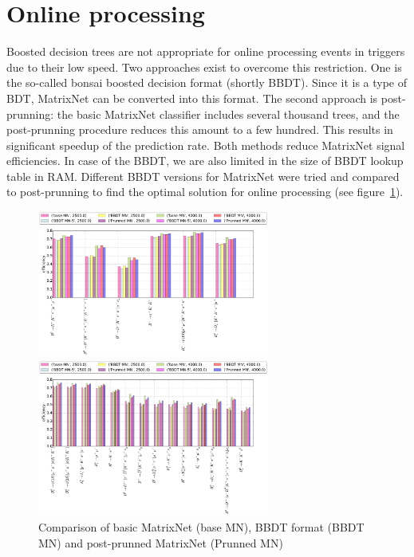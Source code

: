 \documentclass[a4paper]{jpconf}
\begin{document}
\section{Online processing}
Boosted decision trees are not appropriate for online processing events in triggers due to their low speed. Two approaches exist to overcome this restriction.   One is the so-called bonsai boosted decision format\cite{bbdt} (shortly BBDT).  Since it is a type of BDT, MatrixNet can be converted into this format. The second approach is post-prunning: the basic MatrixNet classifier includes several thousand trees, and the post-prunning procedure reduces this amount to a few hundred. This results in significant speedup of the prediction rate.  Both methods reduce MatrixNet signal efficiencies.  In case of the BBDT, we are also limited in the size of BBDT lookup table in RAM.  Different BBDT versions for MatrixNet were tried and compared to post-prunning to find the optimal solution for online processing (see figure~\ref{hlt2_prun}).
\begin{figure}[h]
\begin{minipage}{18pc}
\includegraphics[width=18pc]{../images/prun-base.pdf}
\end{minipage}\hspace{2pc}%
\begin{minipage}{18pc}
\includegraphics[width=18pc]{../images/prun.pdf}
\end{minipage} 
\caption{\label{hlt2_prun} Comparison of basic MatrixNet (base MN), BBDT format (BBDT MN) and post-prunned MatrixNet (Prunned MN)}
\end{figure}
\end{document}
